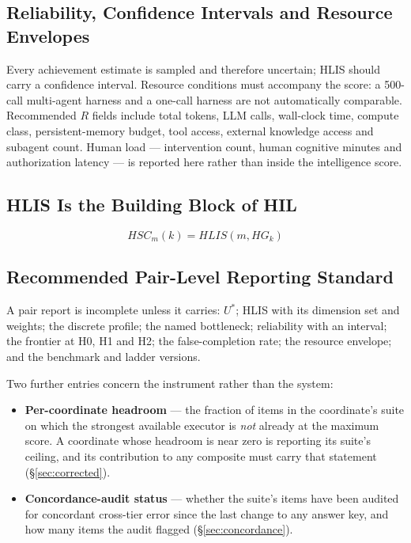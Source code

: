 \documentclass[11pt]{article}
\theoremstyle{definition}
\begin{document}
\subsection{Reliability, Confidence Intervals and Resource Envelopes}\label{sec:resources}

Every achievement estimate is sampled and therefore uncertain; HLIS should carry a confidence interval. Resource conditions must accompany the score: a 500-call multi-agent harness and a one-call harness are not automatically comparable. Recommended $R$ fields include total tokens, LLM calls, wall-clock time, compute class, persistent-memory budget, tool access, external knowledge access and subagent count. Human load --- intervention count, human cognitive minutes and authorization latency --- is reported here rather than inside the intelligence score.

\subsection{HLIS Is the Building Block of HIL}

\begin{equation}
HSC_m(k) = HLIS(m, HG_k)
\end{equation}

\subsection{Recommended Pair-Level Reporting Standard}\label{sec:report}

A pair report is incomplete unless it carries: $U^{*}$; HLIS with its dimension set and weights; the discrete profile; the named bottleneck; reliability with an interval; the frontier at H0, H1 and H2; the false-completion rate; the resource envelope; and the benchmark and ladder versions.

Two further entries concern the instrument rather than the system:

\begin{itemize}
\item \textbf{Per-coordinate headroom} --- the fraction of items in the coordinate's suite on which the strongest available executor is \emph{not} already at the maximum score. A coordinate whose headroom is near zero is reporting its suite's ceiling, and its contribution to any composite must carry that statement (\S\ref{sec:corrected}).
\item \textbf{Concordance-audit status} --- whether the suite's items have been audited for concordant cross-tier error since the last change to any answer key, and how many items the audit flagged (\S\ref{sec:concordance}).
\end{itemize}
\end{document}

